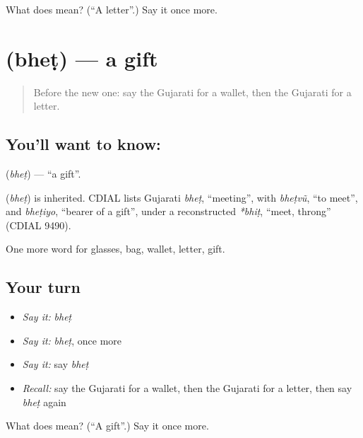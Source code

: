 \begin{tcolorbox}[breakable,colback=teal!4,colframe=teal!35!black,title={Before you move on}]
What does  mean? (\textquotedblleft{}A letter\textquotedblright{}.) Say it once more.
\end{tcolorbox}
\section[\texorpdfstring{\gu{ભેટ} (bheṭ)}{ભેટ (bheṭ)}]{ (bheṭ) — a gift}

\label{lesson:GU-C88-gift}



\begin{quote}
Before the new one: say the Gujarati for a wallet, then the Gujarati for a letter.
\end{quote}

\subsection*{You'll want to know: }
\textbf{} (\emph{bheṭ}) — \textquotedblleft{}a gift\textquotedblright{}.

\begin{cousinweb}
\textbf{} (\emph{bheṭ}) is inherited. CDIAL lists Gujarati \emph{bheṭ}, \textquotedblleft{}meeting\textquotedblright{}, with \emph{bheṭvũ}, \textquotedblleft{}to meet\textquotedblright{}, and \emph{bheṭiyo}, \textquotedblleft{}bearer of a gift\textquotedblright{}, under a reconstructed \emph{*bhiṭ}, \textquotedblleft{}meet, throng\textquotedblright{} (CDIAL 9490).
\end{cousinweb}

\begin{grammarlens}[title={What you've built}]
One more word for glasses, bag, wallet, letter, gift.
\end{grammarlens}

\subsection*{Your turn}
\begin{itemize}
\raggedright
  \item \emph{Say it:} \emph{bheṭ}
  \item \emph{Say it:} \emph{bheṭ}, once more
  \item \emph{Say it:} say \emph{bheṭ}
  \item \emph{Recall:} say the Gujarati for a wallet, then the Gujarati for a letter, then say \emph{bheṭ} again
\end{itemize}

\begin{tcolorbox}[breakable,colback=teal!4,colframe=teal!35!black,title={Before you move on}]
What does  mean? (\textquotedblleft{}A gift\textquotedblright{}.) Say it once more.
\end{tcolorbox}
